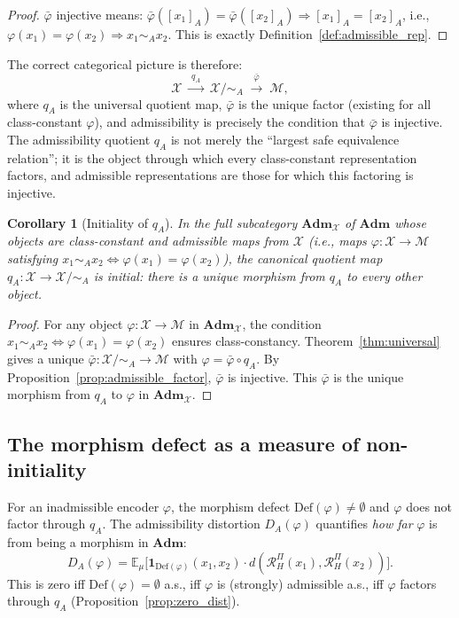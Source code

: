 \documentclass[11pt, a4paper]{article}
\theoremstyle{plain}
\newtheorem{corollary}[theorem]{Corollary}
\theoremstyle{definition}
\theoremstyle{remark}
\newcommand{\E}{\mathbb{E}}
\newcommand{\calX}{\mathcal{X}}
\newcommand{\calM}{\mathcal{M}}
\newcommand{\simA}{\sim_{\!A}}
\newcommand{\RHP}{\mathcal{R}_{H}^{\Pi}}
\newcommand{\DA}{D_{A}(\varphi)}
\newcommand{\XmodA}{\calX/{\simA}}
\newcommand{\Adm}{\mathbf{Adm}}
\newcommand{\Def}{\mathrm{Def}}
\begin{document}
\begin{proof}
$\bar\varphi$ injective means: $\bar\varphi([x_1]_A) = \bar\varphi([x_2]_A)
\Rightarrow [x_1]_A = [x_2]_A$, i.e., $\varphi(x_1) = \varphi(x_2) \Rightarrow
x_1 \simA x_2$. This is exactly Definition~\ref{def:admissible_rep}.
\end{proof}

The correct categorical picture is therefore:
\[
  \calX \;\xrightarrow{\;q_A\;}\; \XmodA \;\xrightarrow{\;\bar\varphi\;}\; \calM,
\]
where $q_A$ is the universal quotient map, $\bar\varphi$ is the unique
factor (existing for all class-constant $\varphi$), and admissibility is
precisely the condition that $\bar\varphi$ is injective. The admissibility
quotient $q_A$ is not merely the ``largest safe equivalence relation''; it is
the object through which every class-constant representation factors, and
admissible representations are those for which this factoring is injective.

\begin{corollary}[Initiality of $q_A$]
\label{cor:initial}
In the full subcategory $\Adm_{\calX}$ of $\Adm$ whose objects are class-constant
and admissible maps from $\calX$ (i.e., maps $\varphi\colon \calX \to \calM$
satisfying $x_1 \simA x_2 \iff \varphi(x_1) = \varphi(x_2)$), the canonical
quotient map $q_A\colon \calX \to \XmodA$ is initial: there is a unique
morphism from $q_A$ to every other object.
\end{corollary}

\begin{proof}
For any object $\varphi\colon \calX \to \calM$ in $\Adm_\calX$, the condition
$x_1 \simA x_2 \iff \varphi(x_1) = \varphi(x_2)$ ensures class-constancy.
Theorem~\ref{thm:universal} gives a unique $\bar\varphi\colon \XmodA \to \calM$
with $\varphi = \bar\varphi \circ q_A$. By Proposition~\ref{prop:admissible_factor},
$\bar\varphi$ is injective. This $\bar\varphi$ is the unique morphism from
$q_A$ to $\varphi$ in $\Adm_\calX$.
\end{proof}

\subsection{The morphism defect as a measure of non-initiality}

For an inadmissible encoder $\varphi$, the morphism defect
$\Def(\varphi) \neq \emptyset$ and $\varphi$ does not factor through $q_A$.
The admissibility distortion $\DA$ quantifies \emph{how far} $\varphi$ is
from being a morphism in $\Adm$:
\[
  \DA = \E_\mu\!\bigl[\mathbf{1}_{\Def(\varphi)}(x_1,x_2) \cdot
    d(\RHP(x_1), \RHP(x_2))\bigr].
\]
This is zero iff $\Def(\varphi) = \emptyset$ a.s., iff $\varphi$ is
(strongly) admissible a.s., iff $\varphi$ factors through $q_A$
(Proposition~\ref{prop:zero_dist}).
\end{document}
